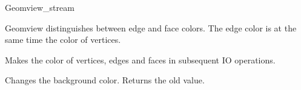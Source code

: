 \begin{ccClass}{Geomview_stream}


Geomview distinguishes between edge and face colors. The edge color
is at the same time the color of vertices. 

{Makes  the color of vertices, edges and faces in subsequent IO 
 operations.}

{Changes the background color. Returns the old value.}


\end{ccClass}
